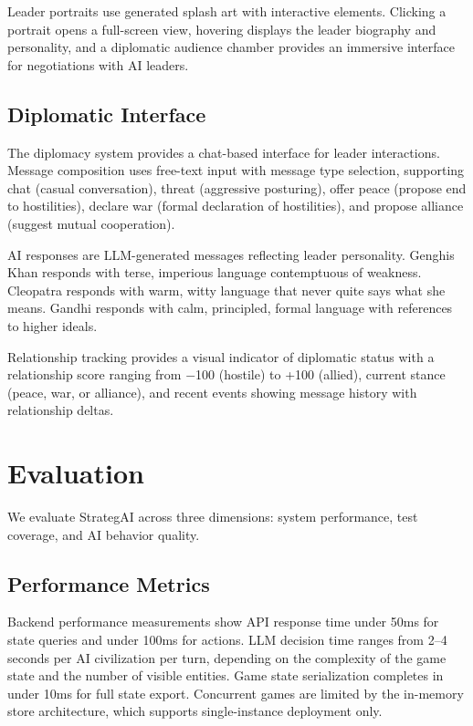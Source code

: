 \documentclass[conference]{IEEEtran}
\begin{document}
Leader portraits use generated splash art with interactive elements. Clicking a portrait opens a full-screen view, hovering displays the leader biography and personality, and a diplomatic audience chamber provides an immersive interface for negotiations with AI leaders.

\subsection{Diplomatic Interface}

The diplomacy system provides a chat-based interface for leader interactions. Message composition uses free-text input with message type selection, supporting chat (casual conversation), threat (aggressive posturing), offer peace (propose end to hostilities), declare war (formal declaration of hostilities), and propose alliance (suggest mutual cooperation).

AI responses are LLM-generated messages reflecting leader personality. Genghis Khan responds with terse, imperious language contemptuous of weakness. Cleopatra responds with warm, witty language that never quite says what she means. Gandhi responds with calm, principled, formal language with references to higher ideals.

Relationship tracking provides a visual indicator of diplomatic status with a relationship score ranging from $-$100 (hostile) to +100 (allied), current stance (peace, war, or alliance), and recent events showing message history with relationship deltas.

\section{Evaluation}
\label{sec:evaluation}

We evaluate StrategAI across three dimensions: system performance, test coverage, and AI behavior quality.

\subsection{Performance Metrics}

Backend performance measurements show API response time under 50ms for state queries and under 100ms for actions. LLM decision time ranges from 2--4 seconds per AI civilization per turn, depending on the complexity of the game state and the number of visible entities. Game state serialization completes in under 10ms for full state export. Concurrent games are limited by the in-memory store architecture, which supports single-instance deployment only.
\end{document}
